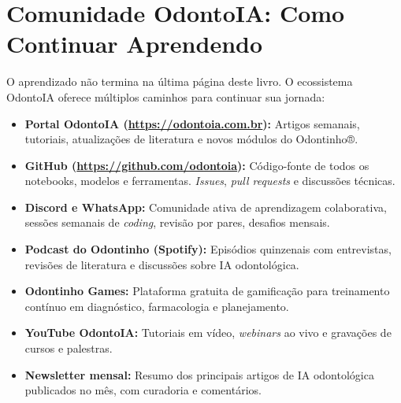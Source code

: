 \section{Comunidade OdontoIA: Como Continuar Aprendendo}
\label{sec:comunidade}

\nivelzero

O aprendizado não termina na última página deste livro. O ecossistema OdontoIA
oferece múltiplos caminhos para continuar sua jornada:

\begin{itemize}
  \item \textbf{Portal OdontoIA (\url{https://odontoia.com.br}):} Artigos
    semanais, tutoriais, atualizações de literatura e novos módulos do
    Odontinho®.

  \item \textbf{GitHub (\url{https://github.com/odontoia}):} Código-fonte de
    todos os notebooks, modelos e ferramentas. \textit{Issues}, \textit{pull
    requests} e discussões técnicas.

  \item \textbf{Discord e WhatsApp:} Comunidade ativa de aprendizagem
    colaborativa, sessões semanais de \textit{coding}, revisão por pares,
    desafios mensais.

  \item \textbf{Podcast do Odontinho (Spotify):} Episódios quinzenais com
    entrevistas, revisões de literatura e discussões sobre IA odontológica.

  \item \textbf{Odontinho Games:} Plataforma gratuita de gamificação para
    treinamento contínuo em diagnóstico, farmacologia e planejamento.

  \item \textbf{YouTube OdontoIA:} Tutoriais em vídeo, \textit{webinars} ao
    vivo e gravações de cursos e palestras.

  \item \textbf{Newsletter mensal:} Resumo dos principais artigos de IA
    odontológica publicados no mês, com curadoria e comentários.
\end{itemize}


